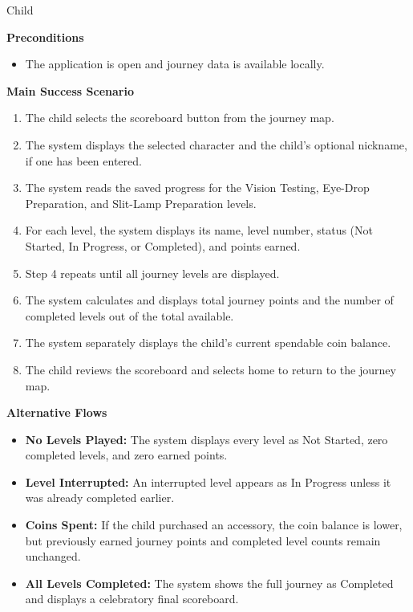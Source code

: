 \documentclass[10pt]{article}
\makeatletter
\newcommand{\termsecnum}{\ifnum\value{subsection}=0 \thesection\else\thesubsection\fi}
\newcommand{\termmark}[1]{%
  \hypertarget{term:#1}{}%
  \protected@write\@auxout{}{\string\newlabel{termsec:#1}{{\termsecnum}{\thepage}{}{}{}}}%
}
\makeatother
\begin{document}
Child

\textbf{Preconditions}
\begin{itemize}
    \item The application is open and journey data is available locally.
\end{itemize}

\textbf{Main Success Scenario}
\begin{enumerate}
    \item The child selects the scoreboard button from the journey map.
    \item The system displays the selected character and the
    child's optional nickname, if one has been entered.
    \item The system reads the saved progress for the Vision Testing,
    Eye-Drop Preparation, and Slit-Lamp Preparation levels.
    \item For each level, the system displays its name, level number,
    status (Not Started, In Progress, or Completed), and points earned.
    \item Step 4 repeats until all \termmark{journeylevel}journey levels are displayed.
    \item The system calculates and displays total journey points
    and the number of completed levels out of the total available.
    \item The system separately displays the child's current
    spendable coin balance.
    \item The child reviews the scoreboard and selects home to
    return to the journey map.
\end{enumerate}

\textbf{Alternative Flows}
\begin{itemize}
    \item \textbf{No Levels Played:} The system displays every level
    as Not Started, zero completed levels, and zero earned points.
    \item \textbf{Level Interrupted:} An interrupted level appears as
    In Progress unless it was already completed earlier.
    \item \textbf{Coins Spent:} If the child purchased an accessory,
    the coin balance is lower, but previously earned journey points
    and completed level counts remain unchanged.
    \item \textbf{All Levels Completed:} The system shows the full
    journey as Completed and displays a celebratory final scoreboard.
\end{itemize}
\end{document}
